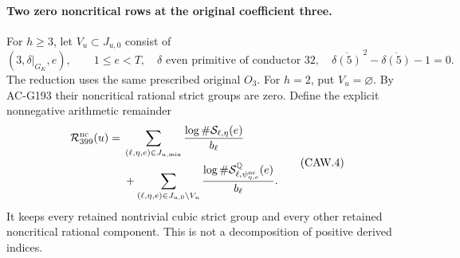 \paragraph{Two zero noncritical rows at the original coefficient three.}
For $h\geq3$, let $V_u\subset J_{u,0}$ consist of
\[
 (3,\delta|_{G_K},e),\qquad 1\leq e<T,
 \quad \delta\text{ even primitive of conductor }32,
 \quad\overline{\delta(5)}^{\,2}
             -\overline{\delta(5)}-1=0.
 \tag{CAW.3}
\]
The reduction uses the same prescribed original $O_3$.
For $h=2$, put $V_u=\varnothing$.
By AC-G193 their noncritical rational strict groups are zero.
Define the explicit nonnegative arithmetic remainder
\[
 \begin{split}
 \mathcal R_{399}^{\rm nc}(u)={}&
 \sum_{(\ell,\eta,e)\in J_{u,\rm mix}}
                \frac{\log\#\mathcal S_{\ell,\eta}(e)}{b_\ell}\\
 &+\sum_{(\ell,\eta,e)\in J_{u,0}\setminus V_u}
       \frac{\log\#\mathcal S^{\mathbb Q}_{\ell,
                       \psi_{\eta,e}^{\rm nc}}(e)}{b_\ell}.
 \end{split}\tag{CAW.4}
\]
It keeps every retained nontrivial cubic strict group and every
other retained noncritical rational component.  This is not a
decomposition of positive derived indices.

